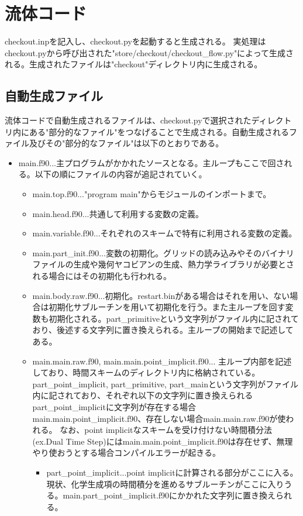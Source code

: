 \documentclass{jsarticle}
\begin{document}
\section{流体コード}%
checkout.inpを記入し、checkout.pyを起動すると生成される。
実処理はcheckout.pyから呼び出された"store/checkout/checkout\_flow.py"によって生成される。生成されたファイルは"checkout"ディレクトリ内に生成される。
\subsection{自動生成ファイル}%
流体コードで自動生成されるファイルは、checkout.pyで選択されたディレクトリ内にある"部分的なファイル"をつなげることで生成される。自動生成されるファイル及びその"部分的なファイル"は以下のとおりである。
\begin{itemize}
\item main.f90...主プログラムがかかれたソースとなる。主ループもここで回される。以下の順にファイルの内容が追記されていく。
\begin{itemize}
\item main.top.f90..."program main"からモジュールのインポートまで。
\item main.head.f90...共通して利用する変数の定義。
\item main.variable.f90...それぞれのスキームで特有に利用される変数の定義。
\item main.part\_init.f90...変数の初期化。グリッドの読み込みやそのバイナリファイルの生成や幾何ヤコビアンの生成、熱力学ライブラリが必要とされる場合にはその初期化も行われる。
\item main.body.raw.f90...初期化。restart.binがある場合はそれを用い、ない場合は初期化サブルーチンを用いて初期化を行う。また主ループを回す変数も初期化される。part\_primitiveという文字列がファイル内に記されており、後述する文字列に置き換えられる。主ループの開始まで記述してある。
\item main.main.raw.f90, main.main.point\_implicit.f90...
主ループ内部を記述しており、時間スキームのディレクトリ内に格納されている。
part\_point\_implicit, part\_primitive, part\_mainという文字列がファイル内に記されており、それぞれ以下の文字列に置き換えられる
part\_point\_implicitに文字列が存在する場合main.main.point\_implicit.f90、存在しない場合main.main.raw.f90が使われる。
なお、point implicitなスキームを受け付けない時間積分法(ex.Dual Time Step)にはmain.main.point\_implicit.f90は存在せず、無理やり使おうとする場合コンパイルエラーが起きる。
\begin{itemize}
\item part\_point\_implicit...point implicitに計算される部分がここに入る。現状、化学生成項の時間積分を進めるサブルーチンがここに入りうる。main.part\_point\_implicit.f90にかかれた文字列に置き換えられる。

\end{itemize}
\end{itemize}
\end{itemize}
\end{document}

